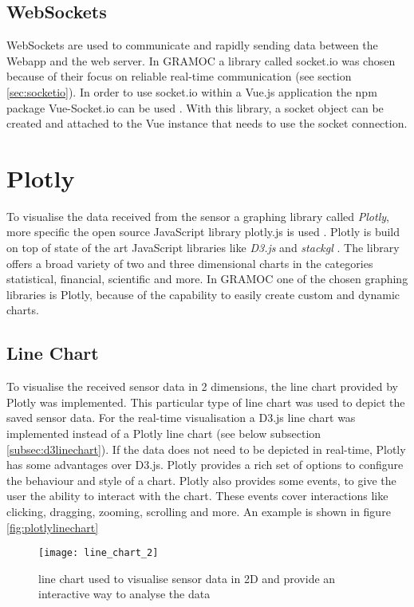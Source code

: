 \subsection{WebSockets}
WebSockets are used to communicate and rapidly sending data between the Webapp and the web server. In GRAMOC a library called socket.io was chosen because of their focus on reliable real-time communication (see section \vref{sec:socketio}). In order to use socket.io within a Vue.js application the npm package Vue-Socket.io can be used \autocite{vuesocketio}. With this library, a socket object can be created and attached to the Vue instance that needs  to use the socket connection.

\section{Plotly}
\label{sec:Plotly}
To visualise the data received from the sensor a graphing library called \textit{Plotly}, more specific the open source JavaScript library {plotly.js} is used \autocite{Plotly} \autocite{PlotlyJS}. Plotly is build on top of state of the art JavaScript libraries like \textit{D3.js}  and \textit{stackgl} \autocite{d3} \autocite{stackgl}. The library offers a broad variety of two and three dimensional charts in the categories statistical, financial, scientific and more. In GRAMOC one of the chosen graphing libraries is Plotly, because of the capability to easily create custom and dynamic charts.

\subsection{Line Chart}
To visualise the received sensor data in 2 dimensions, the line chart provided by Plotly was implemented. This particular type of line chart was used to depict the saved sensor data. For the real-time visualisation a D3.js line chart was implemented instead of a Plotly line chart (see below subsection \vref{subsec:d3linechart}). If the data does not need to be depicted in real-time, Plotly has some advantages over D3.js. Plotly provides a rich set of options to configure the behaviour and style of a chart. Plotly also provides some events, to give the user the ability to interact with the chart. These events cover interactions like clicking, dragging, zooming, scrolling and more. An example is shown in figure \vref{fig:plotlylinechart}

\begin{figure}[H]
    \centering
    \texttt{[image: line\_chart\_2]}
    \caption{line chart used to visualise sensor data in 2D and provide an interactive way to analyse the data}
    \label{fig:plotlylinechart}
\end{figure}

